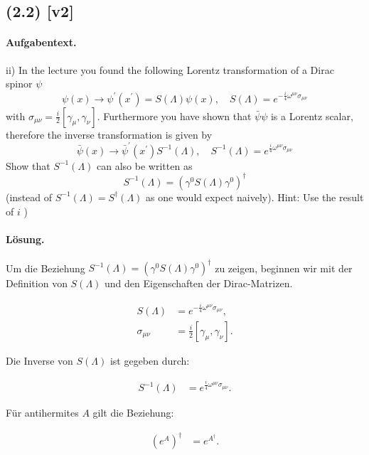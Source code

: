 \documentclass[11pt,a4paper]{article}
\begin{document}

\subsection*{(2.2) [v2]}
\paragraph{Aufgabentext.}
ii) In the lecture you found the following Lorentz transformation of a Dirac spinor $\psi$
$$
\psi(x) \rightarrow \psi^{\prime}\left(x^{\prime}\right)=S(\Lambda) \psi(x), \quad S(\Lambda)=e^{-\frac{i}{4} \omega^{\mu \nu} \sigma_{\mu \nu}}
$$
with $\sigma_{\mu \nu}=\frac{i}{2}\left[\gamma_\mu, \gamma_\nu\right]$.
Furthermore you have shown that $\bar{\psi} \psi$ is a Lorentz scalar, therefore the inverse transformation is given by
$$
\bar{\psi}(x) \rightarrow \bar{\psi}^{\prime}\left(x^{\prime}\right) S^{-1}(\Lambda), \quad S^{-1}(\Lambda)=e^{\frac{i}{4} \omega^{\mu \nu} \sigma_{\mu \nu}}
$$
Show that $S^{-1}(\Lambda)$ can also be written as
$$
S^{-1}(\Lambda)=\left(\gamma^0 S(\Lambda) \gamma^0\right)^{\dagger}
$$
(instead of $S^{-1}(\Lambda)=S^{\dagger}(\Lambda)$ as one would expect naively).
Hint: Use the result of $i$ )

\paragraph{Lösung.}
Um die Beziehung \( S^{-1}(\Lambda) = \left(\gamma^0 S(\Lambda) \gamma^0\right)^{\dagger} \) zu zeigen, beginnen wir mit der Definition von \( S(\Lambda) \) und den Eigenschaften der Dirac-Matrizen.

\begin{align*}
S(\Lambda) &= e^{-\frac{i}{4} \omega^{\mu \nu} \sigma_{\mu \nu}}, \\
\sigma_{\mu \nu} &= \frac{i}{2} [\gamma_\mu, \gamma_\nu].
\end{align*}

Die Inverse von \( S(\Lambda) \) ist gegeben durch:

\begin{align*}
S^{-1}(\Lambda) &= e^{\frac{i}{4} \omega^{\mu \nu} \sigma_{\mu \nu}}.
\end{align*}

Für antihermites \( A \) gilt die Beziehung:

\begin{align*}
(e^A)^{\dagger} &= e^{A^{\dagger}}.
\end{align*}
\end{document}
